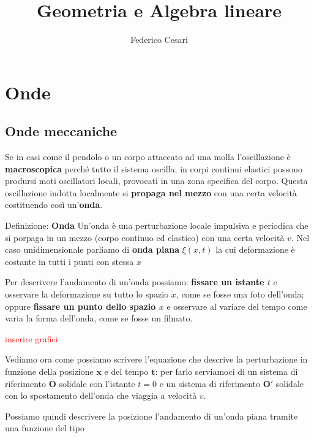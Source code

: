 \documentclass[x11names]{report}
\title{Geometria e Algebra lineare}
\author{Federico Cesari}
\date{}
\begin{document}
	
	
	\tableofcontents
	\newpage
	
	\chapter{Onde}
	\section{Onde meccaniche}
	Se in casi come il pendolo o un corpo attaccato ad una molla l'oscillazione è \textbf{macroscopica} perché tutto il sistema oscilla, in corpi continui elastici possono prodursi moti oscillatori locali, provocati in una zona specifica del corpo. Questa oscillazione indotta localmente si \textbf{propaga nel mezzo} con una certa velocità costituendo così un'\textbf{onda}.
	
	\begin{center}
		\colorbox{yblue}{\begin{minipage}{5.75in}
				\begin{blues}{Definizione: \textbf{Onda}}
					Un'onda è una perturbazione locale impulsiva e periodica che si porpaga in un mezzo (corpo continuo ed elastico) con una certa velocità \(v\). Nel caso unidimensionale parliamo di \textbf{onda piana} \(\xi(x,t)\) la cui deformazione è costante in tutti i punti con stessa \(x\)
				\end{blues}
		\end{minipage}}
	\end{center}
	
	Per descrivere l'andamento di un'onda possiamo: \textbf{fissare un istante \(t\)} e osservare la deformazione su tutto lo spazio \(x\), come se fosse una foto dell'onda; oppure \textbf{fissare un punto dello spazio \(x\)} e osservare al variare del tempo come varia la forma dell'onda, come se fosse un filmato.
	
	\begin{center}
		\textcolor{red}{inserire grafici}
	\end{center}
	
	Vediamo ora come possiamo scrivere l'equazione che descrive la perturbazione in funzione della posizione \(\mathbf{x}\) e del tempo \(\mathbf{t}\): per farlo serviamoci di un sistema di riferimento \(\mathbf{O}\) solidale con l'istante \(t=0\) e un sistema di riferimento \(\mathbf{O'}\) solidale con lo spostamento dell'onda che viaggia a velocità \(v\).
	
	Possiamo quindi descrivere la posizione l'andamento di un'onda piana tramite una funzione del tipo
	
\end{document}
